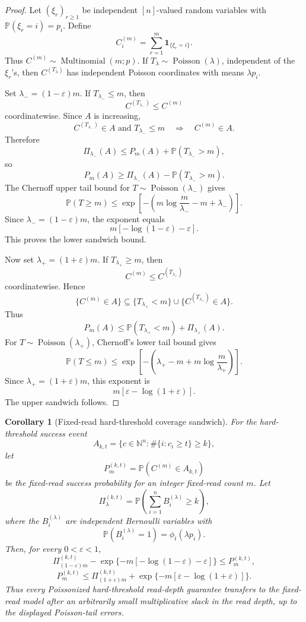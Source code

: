 \documentclass[11pt]{article}
\newtheorem{corollary}{Corollary}
\theoremstyle{definition}
\theoremstyle{remark}
\DeclareMathOperator{\Poisson}{Poisson}
\DeclareMathOperator{\Multinomial}{Multinomial}
\newcommand{\Pbb}{\mathbb P}
\newcommand{\N}{\mathbb N}
\newcommand{\1}{\mathbf 1}
\begin{document}
\begin{proof}
Let \((\xi_r)_{r\ge1}\) be independent \([n]\)-valued random variables with \(\Pbb(\xi_r=i)=p_i\).  Define
\[
  C_i^{(m)}=\sum_{r=1}^m\1_{\{\xi_r=i\}}.
\]
Thus \(C^{(m)}\sim\Multinomial(m;p)\).  If \(T_\lambda\sim\Poisson(\lambda)\), independent of the \(\xi_r\)'s, then \(C^{(T_\lambda)}\) has independent Poisson coordinates with means \(\lambda p_i\).

Set \(\lambda_-=(1-\varepsilon)m\).  If \(T_{\lambda_-}\le m\), then
\[
  C^{(T_{\lambda_-})}\le C^{(m)}
\]
coordinatewise.  Since \(A\) is increasing,
\[
  C^{(T_{\lambda_-})}\in A \text{ and } T_{\lambda_-}\le m
  \quad\Longrightarrow\quad C^{(m)}\in A.
\]
Therefore
\[
  \Pi_{\lambda_-}(A)\le P_m(A)+\Pbb(T_{\lambda_-}>m),
\]
so
\[
  P_m(A)\ge \Pi_{\lambda_-}(A)-\Pbb(T_{\lambda_-}>m).
\]
The Chernoff upper tail bound for \(T\sim\Poisson(\lambda_-)\) gives
\[
  \Pbb(T\ge m)
  \le \exp\left[-\left(m\log\frac{m}{\lambda_-}-m+\lambda_-\right)\right].
\]
Since \(\lambda_-=(1-\varepsilon)m\), the exponent equals
\[
  m[-\log(1-\varepsilon)-\varepsilon].
\]
This proves the lower sandwich bound.

Now set \(\lambda_+=(1+\varepsilon)m\).  If \(T_{\lambda_+}\ge m\), then
\[
  C^{(m)}\le C^{(T_{\lambda_+})}
\]
coordinatewise.  Hence
\[
  \{C^{(m)}\in A\}
  \subseteq \{T_{\lambda_+}<m\}\cup\{C^{(T_{\lambda_+})}\in A\}.
\]
Thus
\[
  P_m(A)\le \Pbb(T_{\lambda_+}<m)+\Pi_{\lambda_+}(A).
\]
For \(T\sim\Poisson(\lambda_+)\), Chernoff's lower tail bound gives
\[
  \Pbb(T\le m)
  \le \exp\left[-\left(\lambda_+-m+m\log\frac{m}{\lambda_+}\right)\right].
\]
Since \(\lambda_+=(1+\varepsilon)m\), this exponent is
\[
  m[\varepsilon-\log(1+\varepsilon)].
\]
The upper sandwich follows.
\end{proof}

\begin{corollary}[Fixed-read hard-threshold coverage sandwich]\label{cor:fixed-read-sandwich}
For the hard-threshold success event
\[
  A_{k,t}=\{c\in\N^n:\#\{i:c_i\ge t\}\ge k\},
\]
let
\[
  P_m^{(k,t)}=\Pbb(C^{(m)}\in A_{k,t})
\]
be the fixed-read success probability for an integer fixed-read count \(m\).  Let
\[
  \Pi_{\lambda}^{(k,t)}=
  \Pbb\left(\sum_{i=1}^n B_i^{(\lambda)}\ge k\right),
\]
where the \(B_i^{(\lambda)}\) are independent Bernoulli variables with
\[
  \Pbb(B_i^{(\lambda)}=1)=\phi_t(\lambda p_i).
\]
Then, for every \(0<\varepsilon<1\),
\[
  \Pi_{(1-\varepsilon)m}^{(k,t)}
  -\exp\{-m[-\log(1-\varepsilon)-\varepsilon]\}
  \le P_m^{(k,t)},
\]
\[
  P_m^{(k,t)}
  \le
  \Pi_{(1+\varepsilon)m}^{(k,t)}
  +\exp\{-m[\varepsilon-\log(1+\varepsilon)]\}.
\]
Thus every Poissonized hard-threshold read-depth guarantee transfers to the fixed-read model after an arbitrarily small multiplicative slack in the read depth, up to the displayed Poisson-tail errors.
\end{corollary}
\end{document}
